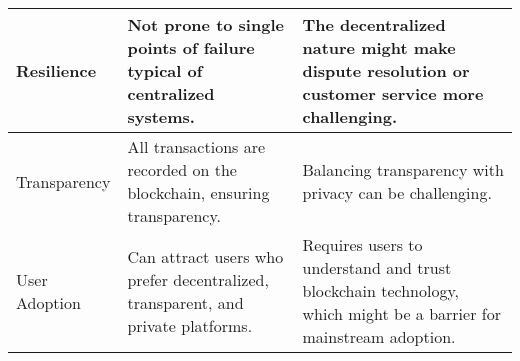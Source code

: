 \begin{table}[h]
\begin{tabular}{p{3cm}p{5cm}p{5cm}}
\midrule
Resilience &  Not prone to single points of failure typical of centralized systems. &  The decentralized nature might make dispute resolution or customer service more challenging. \\
\midrule
Transparency &  All transactions are recorded on the blockchain, ensuring transparency. &  Balancing transparency with privacy can be challenging. \\
\midrule
User Adoption &  Can attract users who prefer decentralized, transparent, and private platforms. &  Requires users to understand and trust blockchain technology, which might be a barrier for mainstream adoption. \\
\bottomrule
\end{tabular}
\end{table}
